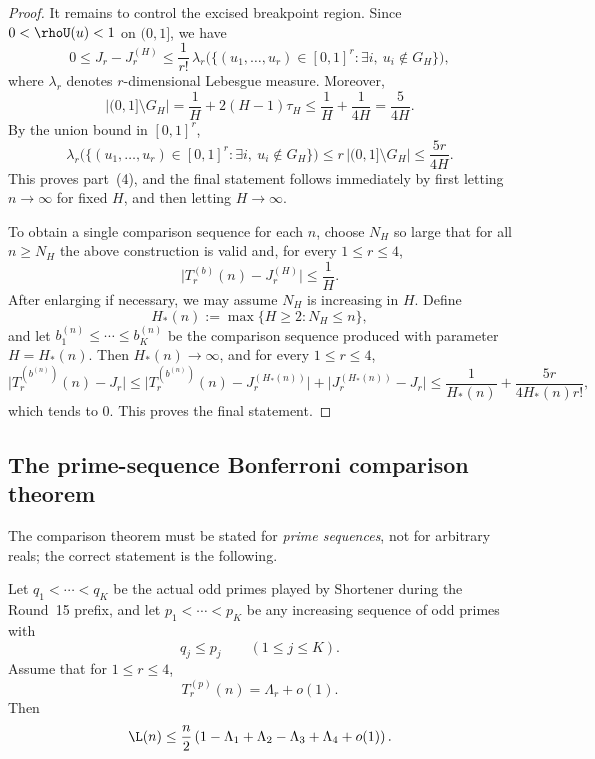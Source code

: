 \begin{proof}
It remains to control the excised breakpoint region.  Since
$0<\rhoU(u)<1$ on $(0,1]$, we have
\[
  0\le J_r-J_r^{(H)}
  \le
  \frac1{r!}\,
  \lambda_r\bigl(\{(u_1,\dots,u_r)\in[0,1]^r:\exists i,\ u_i\notin G_H\}\bigr),
\]
where $\lambda_r$ denotes $r$-dimensional Lebesgue measure.  Moreover,
\[
  |(0,1]\setminus G_H|
  =
  \frac1H+2(H-1)\tau_H
  \le
  \frac1H+\frac{1}{4H}
  =
  \frac{5}{4H}.
\]
By the union bound in $[0,1]^r$,
\[
  \lambda_r\bigl(\{(u_1,\dots,u_r)\in[0,1]^r:\exists i,\ u_i\notin G_H\}\bigr)
  \le
  r\,|(0,1]\setminus G_H|
  \le
  \frac{5r}{4H}.
\]
This proves part~(4), and the final statement follows immediately by first
letting $n\to\infty$ for fixed $H$, and then letting $H\to\infty$.

To obtain a single comparison sequence for each $n$, choose $N_H$ so large
that for all $n\ge N_H$ the above construction is valid and, for every
$1\le r\le 4$,
\[
  \bigl|T_r^{(b)}(n)-J_r^{(H)}\bigr|\le \frac1H.
\]
After enlarging if necessary, we may assume $N_H$ is increasing in $H$.  Define
\[
  H_*(n):=\max\{H\ge 2:N_H\le n\},
\]
and let $b_1^{(n)}\le\cdots\le b_K^{(n)}$ be the comparison sequence produced
with parameter $H=H_*(n)$.  Then $H_*(n)\to\infty$, and for every
$1\le r\le 4$,
\[
  \bigl|T_r^{(b^{(n)})}(n)-J_r\bigr|
  \le
  \bigl|T_r^{(b^{(n)})}(n)-J_r^{(H_*(n))}\bigr|
  +
  \bigl|J_r^{(H_*(n))}-J_r\bigr|
  \le
  \frac{1}{H_*(n)}+\frac{5r}{4H_*(n)r!},
\]
which tends to $0$.  This proves the final statement.
\qedhere
\end{proof}

\subsection{The prime-sequence Bonferroni comparison theorem}

The comparison theorem must be stated for \emph{prime sequences}, not for
arbitrary reals; the correct statement is the following.

\begin{theorem}\label{thm:bonf-comp}
Let $q_1<\cdots<q_K$ be the actual odd primes played by Shortener during the
Round~15 prefix, and let $p_1<\cdots<p_K$ be any increasing sequence of odd
primes with
\[
  q_j \le p_j \qquad (1\le j\le K).
\]
Assume that for $1\le r\le 4$,
\[
  T_r^{(p)}(n) = \Lambda_r + o(1).
\]
Then
\[
  \L(n)
  \le
  \frac n2\left(1-\Lambda_1+\Lambda_2-\Lambda_3+\Lambda_4+o(1)\right).
\]
\end{theorem}

